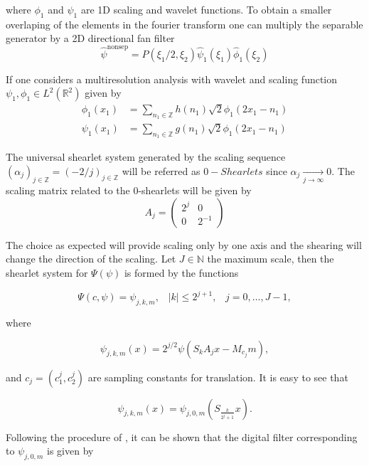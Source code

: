 where $\phi_1$ and $\psi_1$ are 1D scaling and wavelet functions. To obtain a smaller overlaping of the elements in the fourier transform one can multiply the separable generator by a 2D directional fan filter
$$
\hat{\psi}^{\text{nonsep}}=P(\xi_1/2,\xi_2)\hat{\psi}_1(\xi_1)\hat{\phi}_1(\xi_2)
$$ 

\bigskip

If one considers a multiresolution analysis with wavelet and scaling function $\psi_1,\phi_1\in L^2(\mathbb{R}^2)$ given by
$$
\begin{aligned}
\phi_1(x_1)&=\sum_{n_1\in\mathbb{Z}}h(n_1)\sqrt{2}\phi_1(2x_1-n_1)\\
\psi_1(x_1)&=\sum_{n_1\in\mathbb{Z}}g(n_1)\sqrt{2}\phi_1(2x_1-n_1)
\end{aligned}
$$

\bigskip

The universal shearlet system generated by the scaling sequence $(\alpha_j)_{j\in \mathbb{Z}}=(-2/j)_{j\in\mathbb{Z}}$ will be referred as $0-Shearlets$ since $\alpha_j\underset{j\rightarrow\infty}\longrightarrow 0$. The scaling matrix related to the $0$-shearlets will be given by
$$
A_{j}=\left(\begin{matrix} 2^j & 0\\ 0 & 2^{-1}\end{matrix}\right)
$$

The choice as expected will provide scaling only by one axis and the shearing will change the direction of the scaling. Let $J\in\mathbb{N}$ the maximum scale, then the shearlet system for $\Psi(\psi)$ is formed by the functions

$$
\Psi(c,\psi)=\psi_{j,k,m}\textrm{,}\quad |k|\leq 2^{j+1}\textrm{,}\quad j=0,\ldots,J-1,
$$

where

\begin{equation}
\label{eq:LFshearlets3}
\psi_{j,k,m}(x)=2^{j/2}\psi(S_kA_jx-M_{c_j}m),
\end{equation}

and $c_j=(c_1^j,c_2^j)$ are sampling constants for translation. It is easy to see that

\begin{equation}
\label{eq:LFshearlets4}
\psi_{j,k,m}(x)=\psi_{j,0,m}\left( S_{\frac{k}{2^j+1}}x\right).
\end{equation}

Following the procedure of \cite{Shearlab}, it can be shown that the digital filter corresponding to $\psi_{j,0,m}$ is given by

